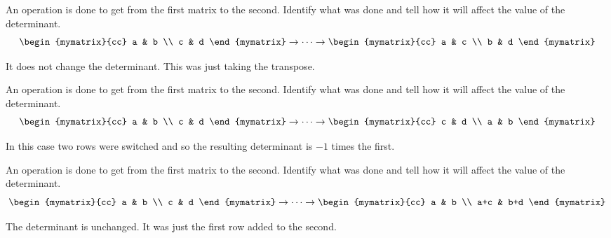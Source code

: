 \begin{enumialphparenastyle}

\begin{ex} An operation is done to get from the first matrix to the second.
Identify what was done and tell how it will affect the value of the
determinant. 
\begin{equation*}
\begin{mymatrix}{cc}
a & b \\
c & d
\end{mymatrix}  \rightarrow \cdots \rightarrow \begin{mymatrix}{cc}
a & c \\
b & d
\end{mymatrix}
\end{equation*}
\begin{sol}
It does not change the determinant. This was just taking the transpose.
\end{sol}
\end{ex}

\begin{ex} An operation is done to get from the first matrix to the second.
Identify what was done and tell how it will affect the value of the
determinant. 
\begin{equation*}
\begin{mymatrix}{cc}
a & b \\
c & d
\end{mymatrix} \rightarrow \cdots \rightarrow \begin{mymatrix}{cc}
c & d \\
a & b
\end{mymatrix}
\end{equation*}
\begin{sol}
In this case two rows were switched and so the resulting determinant is $-1$
times the first.
\end{sol}
\end{ex}


\begin{ex} An operation is done to get from the first matrix to the second.
Identify what was done and tell how it will affect the value of the
determinant. 
\begin{equation*}
\begin{mymatrix}{cc}
a & b \\
c & d
\end{mymatrix} \rightarrow \cdots \rightarrow \begin{mymatrix}{cc}
a & b \\
a+c & b+d
\end{mymatrix}
\end{equation*}
\begin{sol}
The determinant is unchanged. It was just the first row added to the second.
\end{sol}
\end{ex}



\end{enumialphparenastyle}
